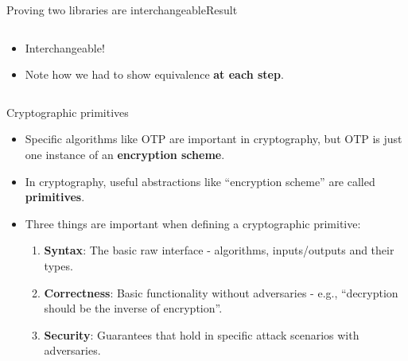 \documentclass[aspectratio=169, lualatex, handout]{beamer}
\begin{document}
\begin{frame}{Proving two libraries are interchangeable}{Result}
	\begin{columns}[c]
		\begin{column}{0.5\textwidth}
			\begin{itemize}[<+->]
				\item Interchangeable!
				\item Note how we had to show equivalence \textbf{at each step}.
			\end{itemize}
		\end{column}
		\begin{column}{0.5\textwidth}
			\begin{center}
			\end{center}
		\end{column}
	\end{columns}
\end{frame}

\begin{frame}{Cryptographic primitives}
	\begin{itemize}[<+->]
		\item Specific algorithms like OTP are important in cryptography, but OTP is just one instance of an \textbf{encryption scheme}.
		\item In cryptography, useful abstractions like ``encryption scheme'' are called \textbf{primitives}.
		\item Three things are important when defining a cryptographic primitive:
		      \begin{enumerate}[<+->]
			      \item \textbf{Syntax}: The basic raw interface - algorithms, inputs/outputs and their types.
			      \item \textbf{Correctness}: Basic functionality without adversaries - e.g., ``decryption should be the inverse of encryption''.
			      \item \textbf{Security}: Guarantees that hold in specific attack scenarios with adversaries.
		      \end{enumerate}
	\end{itemize}
\end{frame}
\end{document}
